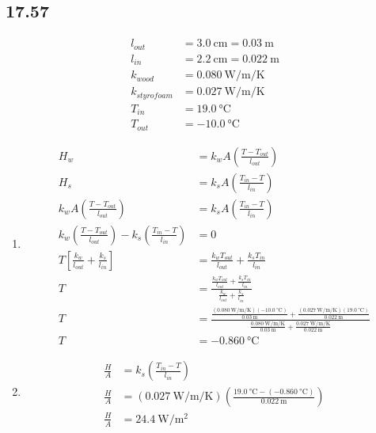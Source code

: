 \documentclass{article}
\begin{document}
\newpage
\subsection{17.57}

\begin{align*}
	l_{out} & = \SI{3.0}{\centi \meter} = \SI{0.03}{\meter} \\
	l_{in} & = \SI{2.2}{\centi \meter} = \SI{0.022}{\meter} \\
	k_{wood} & = \SI{0.080}{\watt \per \meter \per \kelvin} \\
	k_{styrofoam} & = \SI{0.027}{\watt \per \meter \per \kelvin} \\
	T_{in} & = \SI{19.0}{\celsius} \\
	T_{out} & = \SI{-10.0}{\celsius}
\end{align*}
\begin{enumerate}[label = \boldalph]
	\item
		\begin{align*}
			H_{w} & = k_{w}A \left( \frac{ T - T_{out} }{ l_{out} } \right) \\
			H_{s} & = k_{s}A \left( \frac{ T_{in} - T }{ l_{in} } \right) \\
			k_{w}A \left( \frac{ T - T_{out} }{ l_{out} } \right) & = k_{s}A \left( \frac{ T_{in} - T }{ l_{in} } \right) \\
			k_{w} \left( \frac{ T - T_{out} }{ l_{out} } \right) - k_{s} \left( \frac{ T_{in} - T }{ l_{in} } \right) & = 0 \\
			T \left[ \frac{ k_{w} }{ l_{out} } + \frac{ k_{s} }{ l_{in} } \right] & = \frac{ k_{w}T_{out} }{ l_{out} } + \frac{ k_{s}T_{in} }{ l_{in} } \\
			T & = \frac{ \frac{ k_{w}T_{out} }{ l_{out} } + \frac{ k_{s}T_{in} }{ l_{in} } }{ \frac{ k_{w} }{ l_{out} } + \frac{ k_{s} }{ l_{in} } } \\
			T & = \frac{ \frac{ (\SI{0.080}{\watt \per \meter \per \kelvin})(\SI{-10.0}{\celsius}) }{ \SI{0.03}{\meter} } + \frac{ (\SI{0.027}{\watt \per \meter \per \kelvin})(\SI{19.0}{\celsius}) }{ \SI{0.022}{\meter} } }{ \frac{ \SI{0.080}{\watt \per \meter \per \kelvin} }{ \SI{0.03}{\meter} } + \frac{ \SI{0.027}{\watt \per \meter \per \kelvin} }{ \SI{0.022}{\meter} } } \\
			T & = \SI{-0.860}{\celsius}
		\end{align*}
	\item
		\begin{align*}
			\frac{ H }{ A } & = k_{s} \left( \frac{ T_{in} - T }{ l_{in} } \right) \\
			\frac{ H }{ A } & = (\SI{0.027}{\watt \per \meter \per \kelvin}) \left( \frac{ \SI{19.0}{\celsius} - (\SI{-0.860}{\celsius}) }{ \SI{0.022}{\meter} } \right) \\
			\frac{ H }{ A } & = \SI{24.4}{\watt \per \meter \squared}
		\end{align*}
\end{enumerate}
\end{document}

